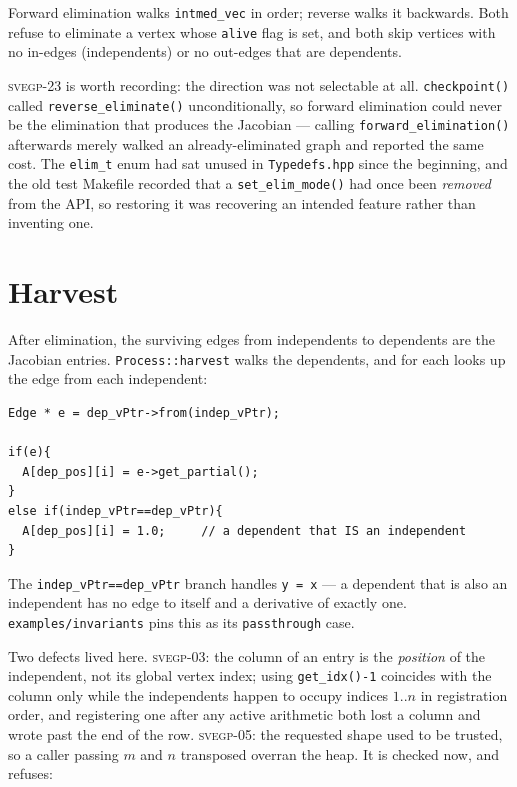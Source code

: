 \documentclass[11pt,a4paper]{report}
\newcommand{\svegp}[1]{\textsc{svegp-#1}}
\newcommand{\code}[1]{\texttt{#1}}
\begin{document}
Forward elimination walks \code{intmed\_vec} in order; reverse walks it
backwards. Both refuse to eliminate a vertex whose \code{alive} flag is set, and
both skip vertices with no in-edges (independents) or no out-edges that are
dependents.

\svegp{23} is worth recording: the direction was not selectable at all.
\code{checkpoint()} called \code{reverse\_eliminate()} unconditionally, so
forward elimination could never be the elimination that produces the Jacobian
--- calling \code{forward\_elimination()} afterwards merely walked an
already-eliminated graph and reported the same cost. The \code{elim\_t} enum had
sat unused in \code{Typedefs.hpp} since the beginning, and the old test Makefile
recorded that a \code{set\_elim\_mode()} had once been \emph{removed} from the
API, so restoring it was recovering an intended feature rather than inventing
one.

\section{Harvest}

After elimination, the surviving edges from independents to dependents are the
Jacobian entries. \code{Process::harvest} walks the dependents, and for each
looks up the edge from each independent:

\begin{lstlisting}
Edge * e = dep_vPtr->from(indep_vPtr);

if(e){
  A[dep_pos][i] = e->get_partial();
}
else if(indep_vPtr==dep_vPtr){
  A[dep_pos][i] = 1.0;     // a dependent that IS an independent
}
\end{lstlisting}

The \code{indep\_vPtr==dep\_vPtr} branch handles \code{y = x} --- a dependent
that is also an independent has no edge to itself and a derivative of exactly
one. \code{examples/invariants} pins this as its \code{passthrough} case.

Two defects lived here. \svegp{03}: the column of an entry is the
\emph{position} of the independent, not its global vertex index; using
\code{get\_idx()-1} coincides with the column only while the independents happen
to occupy indices $1..n$ in registration order, and registering one after any
active arithmetic both lost a column and wrote past the end of the row.
\svegp{05}: the requested shape used to be trusted, so a caller passing $m$ and
$n$ transposed overran the heap. It is checked now, and refuses:
\end{document}
